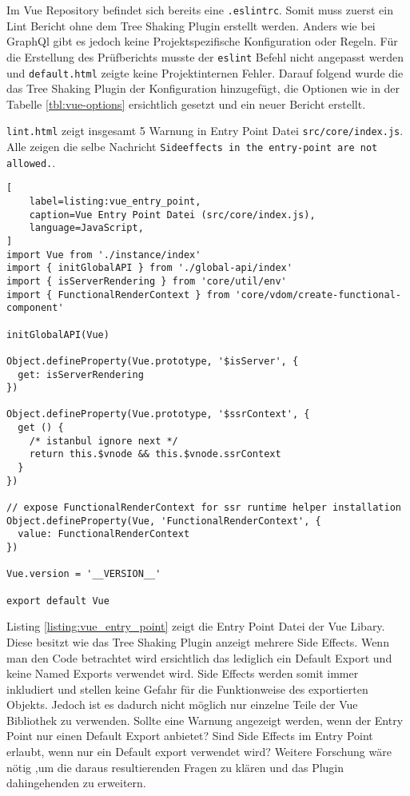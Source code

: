 Im Vue Repository befindet sich bereits eine \lstinline{.eslintrc}. Somit muss zuerst ein Lint Bericht ohne dem Tree Shaking Plugin erstellt werden. Anders wie bei GraphQl gibt es jedoch keine Projektspezifische Konfiguration oder Regeln. Für die Erstellung des Prüfberichts musste der \lstinline{eslint} Befehl nicht angepasst werden und \lstinline{default.html} zeigte keine Projektinternen Fehler. Darauf folgend wurde die das Tree Shaking Plugin der Konfiguration hinzugefügt, die Optionen wie in der Tabelle \ref{tbl:vue-options} ersichtlich gesetzt und ein neuer Bericht erstellt.

\lstinline{lint.html} zeigt insgesamt 5 Warnung in Entry Point Datei \lstinline{src/core/index.js}. Alle zeigen die selbe Nachricht \lstinline{Sideeffects in the entry-point are not allowed.}.

\begin{lstlisting}[
    label=listing:vue_entry_point,
	caption=Vue Entry Point Datei (src/core/index.js),
	language=JavaScript,
]
import Vue from './instance/index'
import { initGlobalAPI } from './global-api/index'
import { isServerRendering } from 'core/util/env'
import { FunctionalRenderContext } from 'core/vdom/create-functional-component'

initGlobalAPI(Vue)

Object.defineProperty(Vue.prototype, '$isServer', {
  get: isServerRendering
})

Object.defineProperty(Vue.prototype, '$ssrContext', {
  get () {
    /* istanbul ignore next */
    return this.$vnode && this.$vnode.ssrContext
  }
})

// expose FunctionalRenderContext for ssr runtime helper installation
Object.defineProperty(Vue, 'FunctionalRenderContext', {
  value: FunctionalRenderContext
})

Vue.version = '__VERSION__'

export default Vue
\end{lstlisting}

Listing \ref{listing:vue_entry_point} zeigt die Entry Point Datei der Vue Libary. Diese besitzt wie das Tree Shaking Plugin anzeigt mehrere Side Effects. Wenn man den Code betrachtet wird ersichtlich das lediglich ein Default Export und keine Named Exports verwendet wird. Side Effects werden somit immer inkludiert und stellen keine Gefahr für die Funktionweise des exportierten Objekts. Jedoch ist es dadurch nicht möglich nur einzelne Teile der Vue Bibliothek zu verwenden. Sollte eine Warnung angezeigt werden, wenn der Entry Point nur einen Default Export anbietet? Sind Side Effects im Entry Point erlaubt, wenn nur ein Default export verwendet wird? Weitere Forschung wäre nötig ,um die daraus resultierenden Fragen zu klären und das Plugin dahingehenden zu erweitern. 

